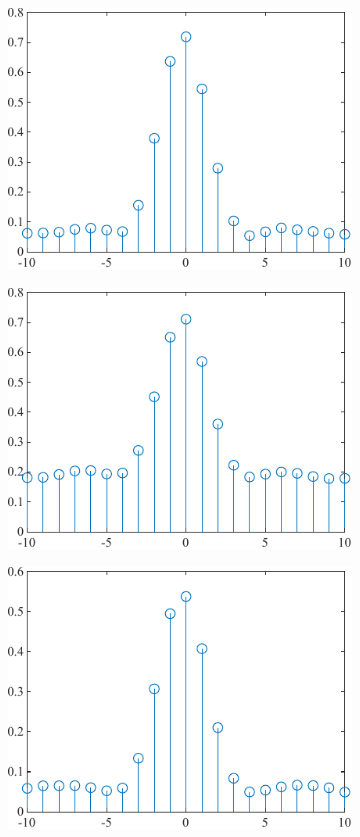 \begin{figure}[H]
\centering
\begin{subfigure}{.5\textwidth}
  \centering
  \includegraphics[width=0.8\linewidth]{4-ANC_Sys/CrossCorrelation 30.pdf}
  \caption{}
  \label{fig_CrossCorrelation30}
\end{subfigure}%
\begin{subfigure}{.5\textwidth}
  \centering
  \includegraphics[width=0.8\linewidth]{4-ANC_Sys/CrossCorrelation 32.pdf}
  \caption{}
  \label{fig_CrossCorrelation32}
\end{subfigure}
\begin{subfigure}{.5\textwidth}
  \centering
  \includegraphics[width=0.8\linewidth]{4-ANC_Sys/CrossCorrelation 35.pdf}

\end{subfigure}
\end{figure}

